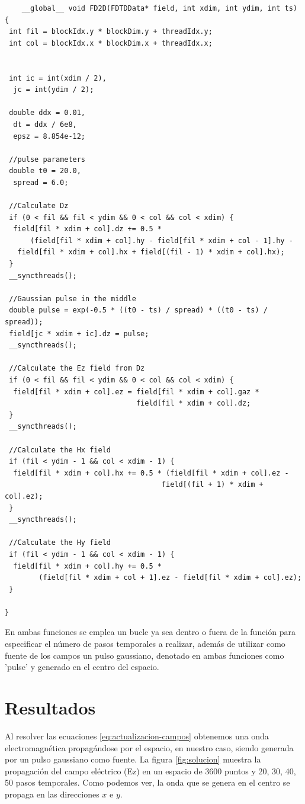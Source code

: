 \documentclass[11pt,a4paper,twoside,pdf]{article}
\numberwithin{equation}{section}
\begin{document}
\begin{verbatim}
    __global__ void FD2D(FDTDData* field, int xdim, int ydim, int ts)
{
 int fil = blockIdx.y * blockDim.y + threadIdx.y;
 int col = blockIdx.x * blockDim.x + threadIdx.x;


 int ic = int(xdim / 2),
  jc = int(ydim / 2);

 double ddx = 0.01,
  dt = ddx / 6e8,
  epsz = 8.854e-12;

 //pulse parameters
 double t0 = 20.0,
  spread = 6.0;

 //Calculate Dz
 if (0 < fil && fil < ydim && 0 < col && col < xdim) {
  field[fil * xdim + col].dz += 0.5 * 
      (field[fil * xdim + col].hy - field[fil * xdim + col - 1].hy -
   field[fil * xdim + col].hx + field[(fil - 1) * xdim + col].hx);
 }
 __syncthreads();

 //Gaussian pulse in the middle
 double pulse = exp(-0.5 * ((t0 - ts) / spread) * ((t0 - ts) / spread));
 field[jc * xdim + ic].dz = pulse;
 __syncthreads();

 //Calculate the Ez field from Dz
 if (0 < fil && fil < ydim && 0 < col && col < xdim) {
  field[fil * xdim + col].ez = field[fil * xdim + col].gaz * 
                               field[fil * xdim + col].dz;
 }
 __syncthreads();

 //Calculate the Hx field
 if (fil < ydim - 1 && col < xdim - 1) {
  field[fil * xdim + col].hx += 0.5 * (field[fil * xdim + col].ez - 
                                     field[(fil + 1) * xdim + col].ez);
 }
 __syncthreads();

 //Calculate the Hy field
 if (fil < ydim - 1 && col < xdim - 1) {
  field[fil * xdim + col].hy += 0.5 * 
        (field[fil * xdim + col + 1].ez - field[fil * xdim + col].ez);
 }

}
\end{verbatim}

En ambas funciones se emplea un bucle ya sea dentro o fuera de la función para especificar el número de pasos temporales a realizar, además de utilizar como fuente de los campos un pulso gaussiano, denotado en ambas funciones como 'pulse' y generado en el centro del espacio.





\section{Resultados}

Al resolver las ecuaciones \ref{eq:actualizacion-campos} obtenemos una onda electromagnética propagándose por el espacio, en nuestro caso, siendo generada por un pulso gaussiano como fuente. La figura \ref{fig:solucion} muestra la propagación del campo eléctrico (Ez) en un espacio de 3600 puntos y 20, 30, 40, 50 pasos temporales. Como podemos ver, la onda que se genera en el centro se propaga en las direcciones $x$ e $y$.  
\end{document}
